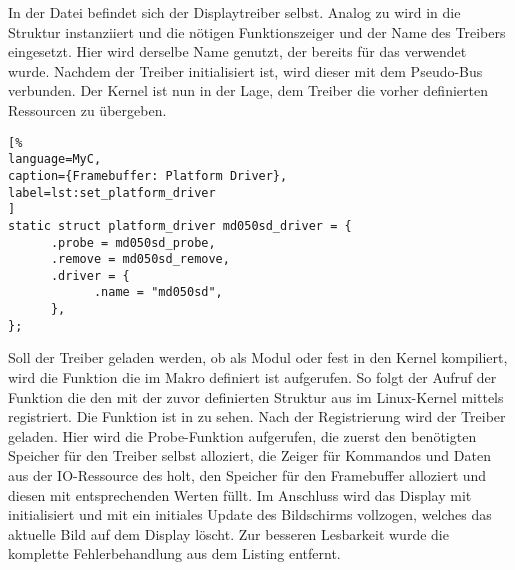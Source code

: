 In der Datei  befindet sich der Displaytreiber selbst. Analog zu  wird in  die Struktur instanziiert und die nötigen Funktionszeiger und der Name des Treibers eingesetzt. Hier wird derselbe Name genutzt, der bereits für das  verwendet wurde. Nachdem der Treiber initialisiert ist, wird dieser mit dem Pseudo-Bus verbunden. Der Kernel ist nun in der Lage, dem Treiber die vorher definierten Ressourcen zu übergeben.

\begin{lstlisting}[%
language=MyC,
caption={Framebuffer: Platform Driver},
label=lst:set_platform_driver
]
static struct platform_driver md050sd_driver = {
      .probe = md050sd_probe,
      .remove = md050sd_remove,
      .driver = {
            .name = "md050sd",
      },
};
\end{lstlisting}

Soll der Treiber geladen werden, ob als Modul oder fest in den Kernel kompiliert, wird die Funktion die im Makro  definiert ist aufgerufen. So folgt der Aufruf der Funktion  die den  mit der zuvor definierten Struktur  aus  im Linux-Kernel mittels 
 registriert. Die Funktion  ist in  zu sehen. 
Nach der Registrierung wird der Treiber geladen. Hier wird die Probe-Funktion  aufgerufen, die zuerst den benötigten Speicher für den Treiber selbst alloziert, die Zeiger für Kommandos und Daten aus der IO-Ressource des  holt, den Speicher für den Framebuffer alloziert und diesen mit entsprechenden Werten füllt. Im Anschluss wird das Display mit  initialisiert und mit  ein initiales Update des Bildschirms vollzogen, welches das aktuelle Bild auf dem Display löscht. Zur besseren Lesbarkeit wurde die komplette Fehlerbehandlung aus dem Listing entfernt. 

